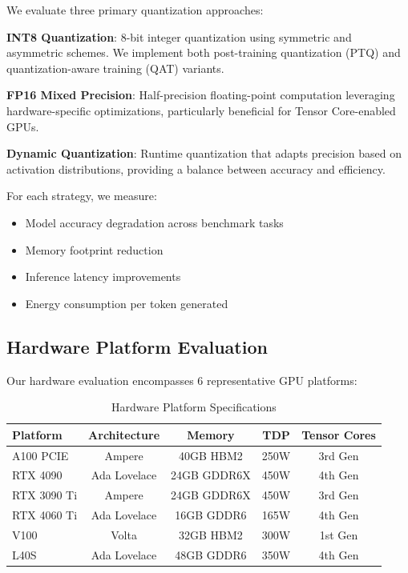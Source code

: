 \documentclass[sigconf]{acmart}
\begin{document}
We evaluate three primary quantization approaches:

\textbf{INT8 Quantization}: 8-bit integer quantization using symmetric and asymmetric schemes. We implement both post-training quantization (PTQ) and quantization-aware training (QAT) variants.

\textbf{FP16 Mixed Precision}: Half-precision floating-point computation leveraging hardware-specific optimizations, particularly beneficial for Tensor Core-enabled GPUs.

\textbf{Dynamic Quantization}: Runtime quantization that adapts precision based on activation distributions, providing a balance between accuracy and efficiency.

For each strategy, we measure:
\begin{itemize}
\item Model accuracy degradation across benchmark tasks
\item Memory footprint reduction
\item Inference latency improvements
\item Energy consumption per token generated
\end{itemize}

\subsection{Hardware Platform Evaluation}

Our hardware evaluation encompasses 6 representative GPU platforms:

\begin{table}[h]
\centering
\caption{Hardware Platform Specifications}
\label{tab:hardware}
\begin{tabular}{@{}lcccc@{}}
\toprule
\textbf{Platform} & \textbf{Architecture} & \textbf{Memory} & \textbf{TDP} & \textbf{Tensor Cores} \\
\midrule
A100 PCIE & Ampere & 40GB HBM2 & 250W & 3rd Gen \\
RTX 4090 & Ada Lovelace & 24GB GDDR6X & 450W & 4th Gen \\
RTX 3090 Ti & Ampere & 24GB GDDR6X & 450W & 3rd Gen \\
RTX 4060 Ti & Ada Lovelace & 16GB GDDR6 & 165W & 4th Gen \\
V100 & Volta & 32GB HBM2 & 300W & 1st Gen \\
L40S & Ada Lovelace & 48GB GDDR6 & 350W & 4th Gen \\
\bottomrule
\end{tabular}
\end{table}
\end{document}
